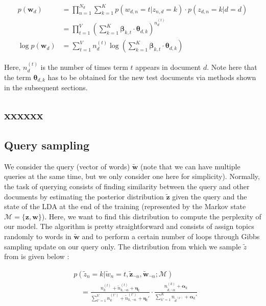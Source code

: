 \documentclass{article}
\begin{document}
\begin{align}
p(\mathbf{w}_d) & = \prod_{n=1}^{N_d} \sum_{k=1} ^K p(w_{d,n}=t|z_{n,d}=k) \cdot p(z_{d,n}=k|d=d) \nonumber\\
				& = \prod_{t=1}^{V} \left( \sum_{k=1}^K \bm{\beta}_{k,t} \cdot \bm{\theta}_{d,k} \right)^{n_d ^{(t)}}\nonumber\\
\log p(\mathbf{w}_d) & = \sum_{t=1}^V n_d ^{(t)} \log \left( \sum_{k=1}^K \bm{\beta}_{k,t} \cdot \bm{\theta}_{d,k} \right)
\end{align}

Here, $n_d ^{(t)}$ is the number of times term $t$ appears in document $d$. Note here that the term $\bm{\theta}_{d,k}$ has to be obtained for the new test documents via methods shown in the subsequent sections.

\subsection{xxxxxx}

\subsection{Query sampling}

We consider the query (vector of words) $\tilde{\mathbf{w}}$ (note that we can have multiple queries at the same time, but we only consider one here for simplicity). Normally, the task of querying consists of finding similarity between the query and other documents by estimating the posterior distribution $\tilde{\mathbf{z}}$ given the query and the state of the LDA at the end of the training (represented by the Markov state $\bm{\mathcal{M}}=\{ \mathbf{z},\mathbf{w} \}$). Here, we want to find this distribution to compute the perplexity of our model. The algorithm is pretty straightforward and consists of assign topics randomly to words in $\tilde{\mathbf{w}}$ and to perform a certain number of loops through Gibbs sampling update on our query only. The distribution from which we sample $\tilde{z}$ from is given below :

\begin{align}\label{eq:posterior_query}
& p(\tilde{z}_n=k|\tilde{w}_n=t, \tilde{\mathbf{z}}_{\neg n},\tilde{\mathbf{w}}_{\neg n};\bm{\mathcal{M}}) \nonumber\\
& \quad = \frac{n_k ^{(t)} + \tilde{n}_{k, \neg n} ^{(t)} + \bm{\eta}_t}{\sum_{t'=1}^V n_k ^{(t')} + \tilde{n}_{k, \neg n} ^{(t')} + \bm{\eta}_t'} \cdot \frac{n_{\tilde{d},\neg n}^{(k)} + \bm{\alpha}_k}{\sum_{k'=1}^K n_{\tilde{d}^{(k')}} + \bm{\alpha}_k'}
\end{align}
\end{document}
